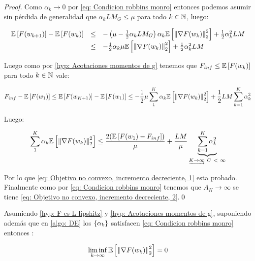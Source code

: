 \begin{proof}
	Como $\alpha_k \rightarrow 0$ por \ref{eq: Condicion robbins monro} entonces podemos asumir sin p\'erdida de generalidad que $\alpha_k L M_G \leq \mu$ para todo $k \in {\mathbb{N}}$, luego:
	
		\begin{equation*}
	\begin{array}{rcl}
	\mathbb{E} \left[F(w_{k+1})\right] - \mathbb{E} \left[F(w_k)\right] & \leq & - \left(\mu - \frac{1}{2}\alpha_k L M_G \right) \alpha_k \mathbb{E} \left[\left\lVert\nabla F(w_k)\right\rVert_2^2\right] + \frac{1}{2} \alpha_k^2 LM \\
	& \leq & - \frac{1}{2}\alpha_k \mu \mathbb{E} \left[\left\lVert\nabla F(w_k)\right\rVert_2^2\right] + \frac{1}{2} \alpha_k^2 LM
	\end{array}
	\end{equation*}
	
	Luego como por \ref{hyp: Acotaciones momentos de g} tenemos que $F_{inf} \leq \mathbb{E} \left[F(w_k)\right]$ para todo $k \in {\mathbb{N}}$ vale:
	
	\begin{equation*}
	F_{inf} - \mathbb{E} \left[F(w_1)\right] \leq \mathbb{E} \left[F(w_{K+1})\right] - \mathbb{E} \left[F(w_1)\right] \leq  - \frac{1}{2}\mu \sum\limits_{1}^{K}{\alpha_k \mathbb{E} \left[\left\lVert\nabla F(w_k)\right\rVert_2^2\right]} + \frac{1}{2} LM \sum\limits_{k=1}^{K} {\alpha_k^2}
	\end{equation*}
	
	Luego:
	
		\begin{equation*}
	\sum\limits_{1}^{K}{\alpha_k \expectation{\norm{\nabla F(w_k)}_2^2}}  \leq  \dfrac{2 (\expectation{F(w_1) - F_{inf} })}{\mu} + \frac{LM}{\mu}  \underbrace{\sum\limits_{k=1}^{K} {\alpha_k^2}}_{\underrightarrow{K \rightarrow \infty} \ C  \ < \ \infty }
	\end{equation*}
	
	
	Por lo que \ref{eq: Objetivo no convexo, incremento decreciente, 1} esta probado. Finalmente como por \ref{eq: Condicion robbins monro} tenemos que $A_K \rightarrow \infty$ se tiene \ref{eq: Objetivo no convexo, incremento decreciente, 2}.\qed
	
\end{proof}

\begin{corollary}
	\label{coro: Gradientes cerca de cero, Objetivo no convexo, Incrementos decrecientes}
	Asumiendo \ref{hyp: F es L lipshitz} y \ref{hyp: Acotaciones momentos de g}, suponiendo adem\'as que en \ref{algo: DE} los $\left\lbrace\alpha_k\right\rbrace$ satisfacen \ref{eq: Condicion robbins monro} entonces : 
	
	\begin{equation}
		\liminf\limits_{k \rightarrow \infty} {\mathbb{E} \left[\left\lVert\nabla F (w_k)\right\rVert_2^2\right]} = 0 
	\end{equation}
	
\end{corollary}

